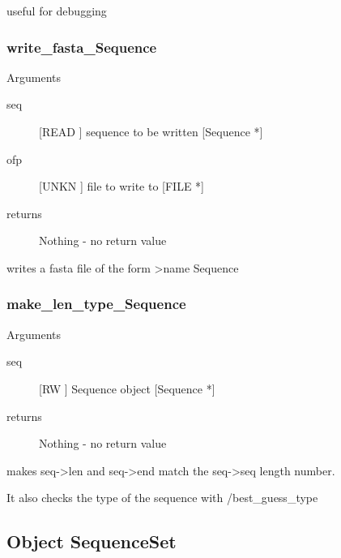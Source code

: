 useful for debugging


\subsubsection{write_fasta_Sequence}

Arguments
\begin{description}
\item[seq] [READ ] sequence to be written [Sequence *]
\item[ofp] [UNKN ] file to write to [FILE *]
\item[returns] Nothing - no return value
\end{description}
writes a fasta file of the form
>name
Sequence


\subsubsection{make_len_type_Sequence}

Arguments
\begin{description}
\item[seq] [RW   ] Sequence object [Sequence *]
\item[returns] Nothing - no return value
\end{description}
makes seq->len and seq->end match the seq->seq
length number. 


It also checks the type of the sequence with
/best_guess_type


\subsection{Object SequenceSet}

